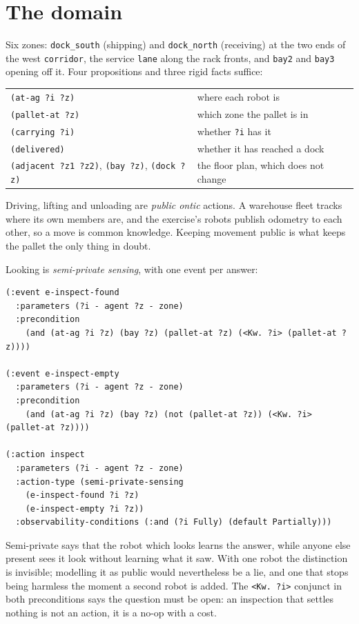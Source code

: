\documentclass[11pt,a4paper]{article}
\theoremstyle{definition}
\newcommand{\code}[1]{\texttt{\small #1}}
\begin{document}
\section{The domain}

Six zones: \code{dock\_south} (shipping) and \code{dock\_north} (receiving) at
the two ends of the west \code{corridor}, the service \code{lane} along the
rack fronts, and \code{bay2} and \code{bay3} opening off it. Four propositions
and three rigid facts suffice:

\begin{center}
\begin{tabular}{@{}ll@{}}
\toprule
\code{(at-ag ?i ?z)} & where each robot is \\
\code{(pallet-at ?z)} & which zone the pallet is in \\
\code{(carrying ?i)} & whether \code{?i} has it \\
\code{(delivered)} & whether it has reached a dock \\
\midrule
\code{(adjacent ?z1 ?z2)}, \code{(bay ?z)}, \code{(dock ?z)} & the floor plan, which does not change \\
\bottomrule
\end{tabular}
\end{center}

Driving, lifting and unloading are \emph{public ontic} actions. A warehouse
fleet tracks where its own members are, and the exercise's robots publish
odometry to each other, so a move is common knowledge. Keeping movement public
is what keeps the pallet the only thing in doubt.

Looking is \emph{semi-private sensing}, with one event per answer:

\begin{lstlisting}
(:event e-inspect-found
  :parameters (?i - agent ?z - zone)
  :precondition
    (and (at-ag ?i ?z) (bay ?z) (pallet-at ?z) (<Kw. ?i> (pallet-at ?z))))

(:event e-inspect-empty
  :parameters (?i - agent ?z - zone)
  :precondition
    (and (at-ag ?i ?z) (bay ?z) (not (pallet-at ?z)) (<Kw. ?i> (pallet-at ?z))))

(:action inspect
  :parameters (?i - agent ?z - zone)
  :action-type (semi-private-sensing
    (e-inspect-found ?i ?z)
    (e-inspect-empty ?i ?z))
  :observability-conditions (:and (?i Fully) (default Partially)))
\end{lstlisting}

Semi-private says that the robot which looks learns the answer, while anyone
else present sees it look without learning what it saw. With one robot the
distinction is invisible; modelling it as public would nevertheless be a lie,
and one that stops being harmless the moment a second robot is added. The
\code{<Kw. ?i>} conjunct in both preconditions says the question must be open:
an inspection that settles nothing is not an action, it is a no-op with a cost.
\end{document}
